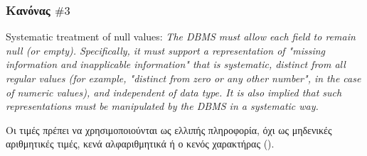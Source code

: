 \begin{frame}[t,fragile]
\frametitle{Κανόνας $\# 3$ }
\begin{minipage}{\wE}
  \en
  \begin{bclogo} [couleur=colBC, logo=\bccrayon, arrondi=0.1, couleurBord=red!80!blue, barre=none] {Systematic treatment of null values:}
    \em
      The DBMS must allow each field to remain null (or empty). Specifically, it must support a representation of "missing information and inapplicable information" that is systematic, distinct from all regular values (for example, "distinct from zero or any other number", in the case of numeric values), and independent of data type. 
      It is also implied that such representations must be manipulated by the DBMS in a systematic way.
  \end{bclogo}
  \el
  \begin{block}{}%
     Οι τιμές {\sq \tnull} πρέπει να χρησιμοποιούνται ως ελλιπής πληροφορία,
        όχι ως μηδενικές αριθμητικές τιμές, κενά αλφαριθμητικά ή ο κενός
        χαρακτήρας ().
  \end{block}
\end{minipage}
\end{frame}

